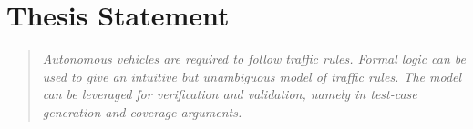 \section{Thesis Statement}



\begin{quote}
\textit{
    Autonomous vehicles are required to follow traffic rules. Formal logic can be used to give an intuitive but unambiguous model of traffic rules. The model can be leveraged for verification and validation, namely in test-case generation and coverage arguments.
}
\end{quote}